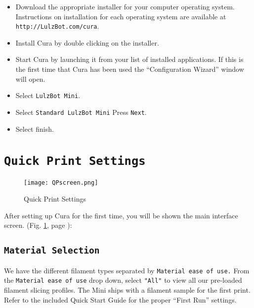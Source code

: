 \begin{itemize}
\item Download the appropriate installer for your computer operating system. Instructions on installation for each operating system are available at \texttt{http://LulzBot.com/cura}.
\item Install Cura by double clicking on the installer.
\item Start Cura by launching it from your list of installed applications. If this is the first time that Cura has been used the ``Configuration Wizard'' window will open.
\item Select \texttt{LulzBot Mini}.
\item Select \texttt{Standard LulzBot Mini} Press \texttt{Next}.
\item Select finish.
\end{itemize}




\section{\texttt{Quick Print Settings}}
\begin{figure}[H]
\centering
\texttt{[image: QPscreen.png]}
\caption{Quick Print Settings}
\label{fig:Cura}
\end{figure} 
After setting up Cura for the first time, you will be shown the main interface screen. (Fig. \ref{fig:Cura}, page \pageref{fig:Cura}): 

\subsection{\texttt{Material Selection}}
We have the different filament types separated by \texttt{Material ease of use.} From the \texttt{Material ease of use} drop down, select \texttt{"All"} to view all our pre-loaded filament slicing profiles. The Mini ships with a filament sample for the first print. Refer to the included Quick Start Guide for the proper ``First Run'' settings.

